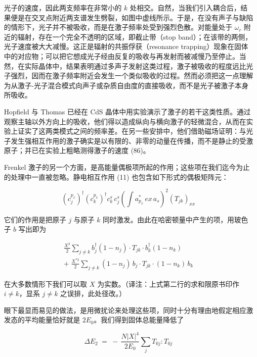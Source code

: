 光子的速度，因此两支频率在非常小的 $k$ 处相交。自然，当我们引入耦合后，结果便是在交叉点附近两支谱发生劈裂，如图中虚线所示。于是，在没有声子与缺陷的情形下，光子并不被吸收，而是在激子频率处受到强烈色散。对能量处于 $\omega_r$ 附近的辐射，存在一个完全不透明的区域，即截止带（stop band）；在该带的两侧，光子速度被大大减慢。这正是辐射的共振俘获（resonance trapping）现象在固体中的对应物；可以把它想成光子经由反复的吸收与再发射而被减慢乃至停止。当然，在实际晶体中，结果表明通过多声子发射这类过程，激子被吸收的程度远比光子强烈，因而在激子频率附近会发生一个类似吸收的过程。然而必须把这一点理解为从激子-光子混合模式向声子或杂质自由度的直接吸收，而不是光子被激子本身所吸收。

Hopfield 与 Thomas 已经在 CdS 晶体中用实验演示了激子的若干这类性质。通过观察主轴以外方向上的吸收，他们得以造成纵向与横向激子的轻微混合，从而在实验上证实了这两类模式之间的频率差。在另一些安排中，他们借助磁场证明：与光子发生强相互作用的激子确实是以有限的、非零的动量在传播，而不是静止的受激原子；并已在实验上粗略测得激子的速度 (86)。

Frenkel 激子的另一个方面，是高能量偶极项所起的作用；这些项在我们迄今为止的处理中一直被忽略。静电相互作用 (11) 也包含如下形式的偶极矩阵元：

\begin{equation*}
\left(c_j^{p_x}\right)^{\dagger} \left(c_k^{p_x}\right)^{\dagger} c_k^{s}\, c_j^{s} \left(\int a_{p_x}^{*}\, ex\, a_s\right)^{2} \left(T_{jk}\right)_{xx}
\end{equation*}

它们的作用是把原子 $j$ 与原子 $k$ 同时激发。由此在哈密顿量中产生的项，用玻色子 $b$ 写出即为

\begin{gather*}
\frac{X^{2}}{2} \sum_{j\neq k} b_j^{\dagger}(1-n_j)\cdot T_{jk}\cdot b_k^{\dagger}(1-n_k) \\
+\; \frac{X^{*2}}{2} \sum_{j\neq k} (1-n_j)\, b_j\cdot T_{jk}\cdot(1-n_k)\, b_k \tag{16}
\end{gather*}

在大多数情形下我们可以取 $X$ 为实数。（译注：上式第二行的求和限原书印作 $i\neq k$，显系 $j\neq k$ 之误排，此处径改。）

眼下最显而易见的做法，是用微扰论来处理这些项，同时十分有理由地假定相应激发态的平均能量恰好就是 $2E_0$。我们得到固体总能量降低了

\begin{equation*}
\Delta E_2 \;=\; -\, \frac{N|X|^{4}}{2E_0} \sum_j T_{0j}:T_{0j}
\end{equation*}

